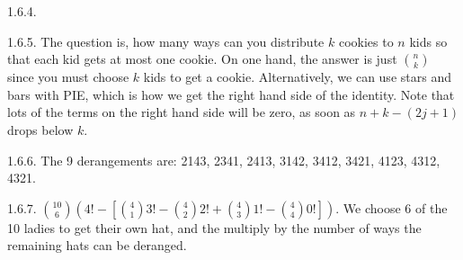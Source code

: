 \begin {itemize}
\begin{ans}{1.6.4.}
\end{ans}
\begin{ans}{1.6.5.}
	The question is, how many ways can you distribute $k$ cookies to $n$ kids so that each kid gets at most one cookie.  On one hand, the answer is just ${n \choose k}$ since you must choose $k$ kids to get a cookie.  Alternatively, we can use stars and bars with PIE, which is how we get the right hand side of the identity.  Note that lots of the terms on the right hand side will be zero, as soon as $n+k-(2j+1)$ drops below $k$.
	
\end{ans}
\begin{ans}{1.6.6.}
		The 9 derangements are: 2143, 2341, 2413, 3142, 3412, 3421, 4123, 4312, 4321.
	
\end{ans}
\begin{ans}{1.6.7.}
	${10 \choose 6}\left(4! - \left[{4 \choose 1} 3! - {4 \choose 2}2! + {4 \choose 3}1! - {4 \choose 4}0!\right]\right)$.  We choose 6 of the 10 ladies to get their own hat, and the multiply by the number of ways the remaining hats can be deranged.
	
\end{ans}
\protect \end {itemize}
